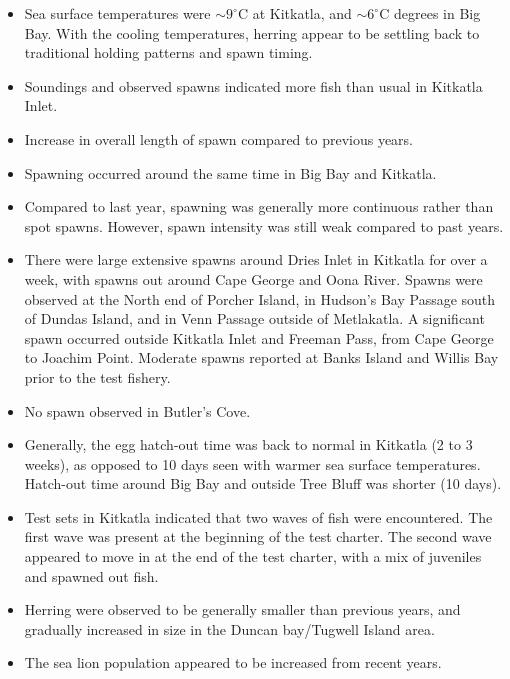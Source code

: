 \begin{itemize}
\item Sea surface temperatures were $\sim9^\circ\text{C}$ at Kitkatla, and $\sim6^\circ\text{C}$ degrees in Big Bay.
With the cooling temperatures, herring appear to be settling back to traditional holding patterns and spawn timing.
\item Soundings and observed spawns indicated more fish than usual in Kitkatla Inlet. 
\item Increase in overall length of spawn compared to previous years.
\item Spawning occurred around the same time in Big Bay and Kitkatla.
\item Compared to last year, spawning was generally more continuous rather than spot spawns.
However, spawn intensity was still weak compared to past years. 
\item There were large extensive spawns around Dries Inlet in Kitkatla for over a week, with spawns out around Cape George and Oona River.
Spawns were observed at the North end of Porcher Island, in Hudson's Bay Passage south of Dundas Island, and in Venn Passage outside of Metlakatla.
A significant spawn occurred outside Kitkatla Inlet and Freeman Pass, from Cape George to Joachim Point. 
Moderate spawns reported at Banks Island and Willis Bay prior to the test fishery.
\item No spawn observed in Butler's Cove.
\item Generally, the egg hatch-out time was back to normal in Kitkatla (2 to 3 weeks), as opposed to 10 days seen with warmer sea surface temperatures.
Hatch-out time around Big Bay and outside Tree Bluff was shorter (10 days).
\item Test sets in Kitkatla indicated that two waves of fish were encountered.
The first wave was present at the beginning of the test charter.
The second wave appeared to move in at the end of the test charter, with a mix of juveniles and spawned out fish.
\item Herring were observed to be generally smaller than previous years, and gradually increased in size in the Duncan bay/Tugwell Island area.
\item The sea lion population appeared to be increased from recent years.
\end{itemize}